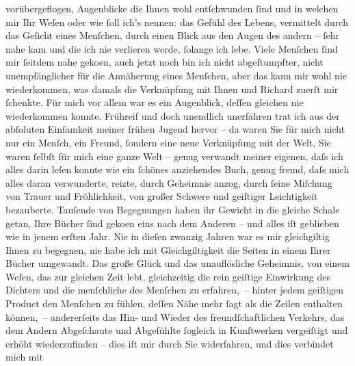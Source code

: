 \begin{ledgroupsized}[t]{13cm}
               vorübergeflogen, Augenblicke die Ihnen wohl entſchwunden ſind und in welchen mir Ihr
               Weſen oder wie ſoll ich’s nennen: das Gefühl des Lebens, vermittelt durch das Geſicht
               eines Menſchen, durch einen Blick aus den Augen des andern – ſehr nahe kam und die
               ich nie verlieren werde, ſolange ich lebe. Viele Menſchen ſind mir ſeitdem nahe
                  geko{\geminationm}en, auch jetzt noch bin ich nicht abgeſtumpfter,
               nicht unempfänglicher für die Annäherung eines Menſchen, aber das kann mir wohl nie
               wiederkommen, was damals die Verknüpfung mit Ihnen und Richard zuerſt mir ſchenkte. Für mich \introOben{}vor
                     allem\introOben{} war es ein Augenblick, deſſen {\pb}gleichen
               nie wiederkommen konnte. Frühreif und doch unendlich unerfahren trat ich aus der
               abſoluten Einſamkeit meiner frühen Jugend hervor – da waren Sie für mich nicht nur
               ein Menſch, ein Freund, ſondern eine neue Verknüpfung mit der Welt, Sie waren ſelbſt
               für mich eine ganze Welt –  genug verwandt meiner
               eigenen, daſs ich alles darin leſen konnte wie ein ſchönes anziehendes Buch, genug
               fremd, daſs mich alles daran verwunderte, reizte, durch Geheimnis anzog, durch ſeine
               Miſchung von Trauer und Fröhlichkeit, von großer Schwere und geiſtiger Leichtigkeit
               bezauberte. Tauſende von Begegnungen haben ihr Gewicht in die gleiche Schale getan,
               Ihre Bücher ſind geko{\geminationm}en eins nach dem Anderen – und
               alles iſt geblieben wie in jenem erſten Jahr. Nie in dieſen zwanzig Jahren war es mir
               gleichgiltig Ihnen zu begegnen, nie habe ich mit Gleichgiltigkeit die Seiten in einem
               Ihrer Bücher umgewandt.\pend
           \pstart
           {\pb}Das große Glück und das unauflösliche Geheimnis, von
               einem Weſen, das zur gleichen Zeit lebt, gleichzeitig die rein geiſtige Einwirkung
               des Dichters und die menſchliche des Menſchen zu erfahren, – hinter jedem geiſtigen
               Product den Menſchen zu fühlen, deſſen Nähe mehr ſagt als die Zeilen enthalten
               können, – andererſeits das Hin- und Wieder des freundſchaftlichen Verkehrs, das dem
               Andern Abgeſchaute und Abgefühlte ſogleich in Kunſtwerken vergeiſtigt und erhöht
               wiederzufinden – dies iſt mir durch Sie widerfahren, und dies verbindet mich mit

\end{ledgroupsized}

